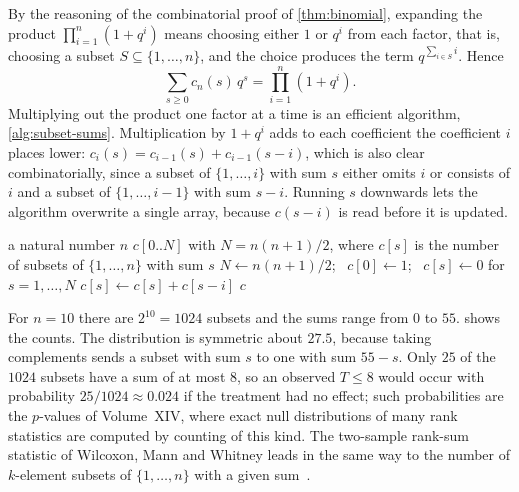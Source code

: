 By the reasoning of the combinatorial proof of \cref{thm:binomial}, expanding the product $\prod_{i=1}^{n}(1+q^i)$ means choosing either $1$ or $q^i$ from each factor, that is, choosing a subset $S\subseteq\{1,\ldots,n\}$, and the choice produces the term $q^{\sum_{i\in S}i}$. Hence
\[
\sum_{s\ge0}c_n(s)\,q^s=\prod_{i=1}^{n}(1+q^i).
\]
Multiplying out the product one factor at a time is an efficient algorithm, \cref{alg:subset-sums}. Multiplication by $1+q^i$ adds to each coefficient the coefficient $i$ places lower: $c_i(s)=c_{i-1}(s)+c_{i-1}(s-i)$, which is also clear combinatorially, since a subset of $\{1,\ldots,i\}$ with sum $s$ either omits $i$ or consists of $i$ and a subset of $\{1,\ldots,i-1\}$ with sum $s-i$. Running $s$ downwards lets the algorithm overwrite a single array, because $c(s-i)$ is read before it is updated.

\begin{algorithm}
\begin{algorithmic}[1]
\Require a natural number $n$
\Ensure $c[0..N]$ with $N=n(n+1)/2$, where $c[s]$ is the number of subsets of $\{1,\ldots,n\}$ with sum $s$
\State $N\gets n(n+1)/2$; \ $c[0]\gets1$; \ $c[s]\gets0$ for $s=1,\ldots,N$
 
   
    \State $c[s]\gets c[s]+c[s-i]$
  \EndFor
\EndFor
\State \Return $c$
\end{algorithmic}
\caption{The coefficients of $\prod_{i=1}^{n}(1+q^i)$. After the pass for $i$, $c[s]$ is the number of subsets of $\{1,\ldots,i\}$ with sum $s$. The algorithm performs $n+\binom{n+1}{3}\approx n^3/6$ additions.}
\label{alg:subset-sums}
\end{algorithm}

For $n=10$ there are $2^{10}=1024$ subsets and the sums range from $0$ to $55$.  shows the counts. The distribution is symmetric about $27.5$, because taking complements sends a subset with sum $s$ to one with sum $55-s$. Only $25$ of the $1024$ subsets have a sum of at most $8$, so an observed $T\le8$ would occur with probability $25/1024\approx0.024$ if the treatment had no effect; such probabilities are the $p$-values of Volume~XIV, where exact null distributions of many rank statistics are computed by counting of this kind. The two-sample rank-sum statistic of Wilcoxon, Mann and Whitney leads in the same way to the number of $k$-element subsets of $\{1,\ldots,n\}$ with a given sum~\cite{mannwhitney1947}.


